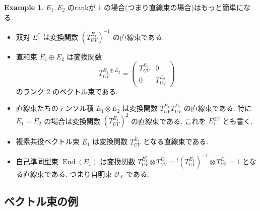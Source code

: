 \documentclass[dvipdfmx,a4paper,11pt]{article} %
\theoremstyle{definition}
\newtheorem{ex}[thm]{Example}
\theoremstyle{remark}
\numberwithin{equation}{section}
\newcommand{\End}[0]{\operatorname{End}}
\begin{document}
\begin{ex}
\(E_1, E_2\) のrankが \(1\) の場合(つまり直線束の場合)はもっと簡単になる.
\begin{itemize}
\item 双対 \(E_1^*\) は変換関数 \((T^{E_1}_{UV})^{-1}\) の直線束である.
\item 直和束 \(E_1\oplus E_2\) は変換関数
\[
T^{E_1\oplus E_2}_{UV}=
\begin{pmatrix}
T^{E_1}_{UV} & 0\\
0 & T^{E_2}_{UV}
\end{pmatrix}
\]
のランク \(2\) のベクトル束である.
\item 直線束たちのテンソル積 \(E_1 \otimes E_2\) は変換関数 \(T^{E_1}_{UV}T^{E_2}_{UV}\) の直線束である. 特に \(E_1=E_2\) の場合は変換関数 \((T^{E_1}_{UV})^2\) の直線束である. これを \(E_1^{\otimes 2}\) とも書く.
\item 複素共役ベクトル束 \(\overline{E_1}\) は変換関数 \(\overline{T^{E_1}_{UV}}\) となる直線束である.
\item 自己準同型束
\(\End(E_1)\) は変換関数 \(T^{E_1^*}_{UV}\otimes T^{E_1}_{UV}={}^t(T^{E_1}_{UV})^{-1}\otimes T^{E_1}_{UV}=1\) となる直線束である. つまり自明束 \(\mathcal{O}_{X}\) である.
\end{itemize}
\end{ex}



\subsection{ベクトル束の例}
\end{document}
